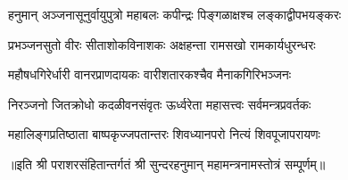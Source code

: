 

\twolineshloka
{हनुमान् अञ्जनासूनुर्वायुपुत्रो महाबलः}
{कपीन्द्रः पिङ्गळाक्षश्च लङ्काद्वीपभयङ्करः}

\twolineshloka
{प्रभञ्जनसुतो वीरः सीताशोकविनाशकः}
{अक्षहन्ता रामसखो रामकार्यधुरन्धरः}

\twolineshloka
{महौषधगिरेर्धारी वानरप्राणदायकः}
{वारीशतारकश्चैव मैनाकगिरिभञ्जनः}

\twolineshloka
{निरञ्जनो जितक्रोधो कदळीवनसंवृतः}
{ऊर्ध्वरेता महासत्त्वः सर्वमन्त्रप्रवर्तकः}

\twolineshloka
{महालिङ्गप्रतिष्ठाता बाष्पकृज्जपतान्तरः}
{शिवध्यानपरो नित्यं शिवपूजापरायणः}


॥इति श्री पराशरसंहितान्तर्गतं श्री सुन्दरहनुमान् महामन्त्रनामस्तोत्रं सम्पूर्णम्॥